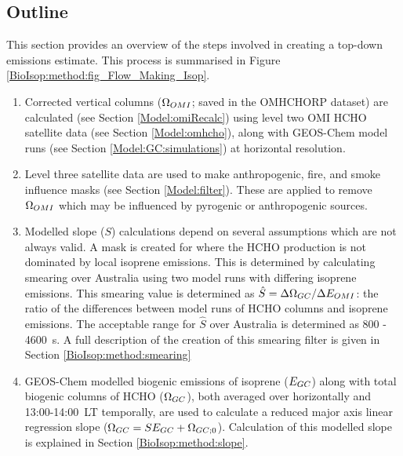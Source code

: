   \subsection{Outline}
    \label{BioIsop:method:outline}
    This section provides an overview of the steps involved in creating a top-down emissions estimate. %
    This process is summarised in Figure \ref{BioIsop:method:fig_Flow_Making_Isop}.
    \begin{enumerate}
      \item 
        Corrected vertical columns ($\Omega_{OMI}$; saved in the OMHCHORP dataset) are calculated (see Section \ref{Model:omiRecalc}) using level two OMI HCHO satellite data (see Section \ref{Model:omhcho}), along with GEOS-Chem model runs (see Section \ref{Model:GC:simulations}) at \highhr horizontal resolution.
      \item 
        Level three satellite data are used to make anthropogenic, fire, and smoke influence masks (see Section \ref{Model:filter}).
        These are applied to remove $\Omega_{OMI}$ which may be influenced by pyrogenic or anthropogenic sources. 
      \item
        Modelled slope ($S$) calculations depend on several assumptions which are not always valid.
        A mask is created for where the HCHO production is not dominated by local isoprene emissions. 
        This is determined by calculating smearing over Australia using two model runs with differing isoprene emissions.
        This smearing value is determined as $\hat{S}=\Delta \Omega_{GC}/ \Delta E_{OMI}$: the ratio of the differences between model runs of HCHO columns and isoprene emissions.
        The acceptable range for $\hat{S}$ over Australia is determined as 800 - 4600~s.
        A full description of the creation of this smearing filter is given in Section \ref{BioIsop:method:smearing}
      \item 
        GEOS-Chem modelled biogenic emissions of isoprene ($E_{GC}$) along with total biogenic columns of HCHO ($\Omega_{GC}$), both averaged over \lowhr horizontally and 13:00-14:00~LT temporally, are used to calculate a reduced major axis linear regression slope ($\Omega_{GC}=S E_{GC} + \Omega_{GC;0}$).
        Calculation of this modelled slope is explained in Section \ref{BioIsop:method:slope}.

\end{enumerate}
